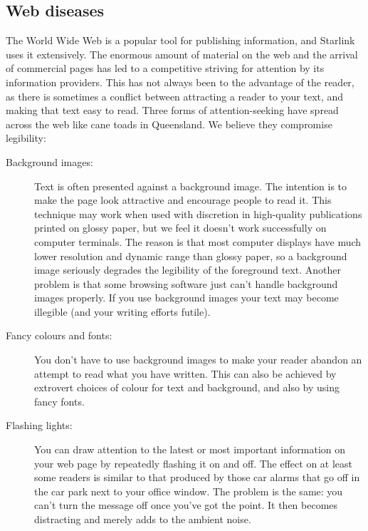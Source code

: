\subsection{Web diseases}

The World Wide Web is a popular tool for publishing information,
and Starlink uses it extensively.
The enormous amount of material on the web and the arrival of commercial pages
has led to a competitive striving for attention by its information providers.
This has not always been to the advantage of the reader, as there is sometimes
a conflict between attracting a reader to your text, and making that text
easy to read.
Three forms of attention-seeking have spread across the web like cane toads in
Queensland.
We believe they compromise legibility:

\begin{description}

\item [Background images:]

Text is often presented against a background image.
The intention is to make the page look attractive and encourage people to
read it.
This technique may work when used with discretion in high-quality publications
printed on glossy paper, but we feel it doesn't work successfully on computer
terminals.
The reason is that most computer displays have much lower resolution and
dynamic range than glossy paper, so a background image seriously degrades the
legibility of the foreground text.
Another problem is that some browsing software just can't handle background
images properly.
If you use background images your text may become illegible (and your writing
efforts futile).

\item [Fancy colours and fonts:]

You don't have to use background images to make your reader abandon an
attempt to read what you have written.
This can also be achieved by extrovert choices of colour for text and
background, and also by using fancy fonts.

\item [Flashing lights:]

You can draw attention to the latest or most important information on your web
page by repeatedly flashing it on and off.
The effect on at least some readers is similar to that produced by those car
alarms that go off in the car park next to your office window.
The problem is the same: you can't turn the message off once you've got the
point.
It then becomes distracting and merely adds to the ambient noise.

\end{description}

